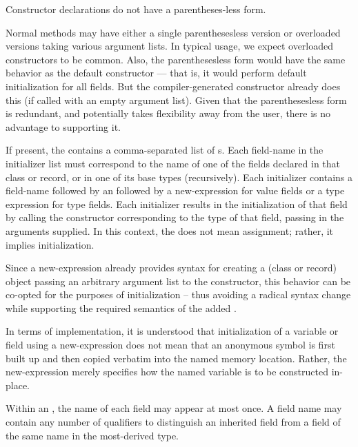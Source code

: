 Constructor declarations do not have a parentheses-less form.
\begin{rationale}
Normal methods may have either a single parenthesesless version or overloaded
versions taking various argument lists.  In typical usage, we expect overloaded
constructors to be common.  Also, the parenthesesless form would have the same
behavior as the default constructor --- that is, it would perform default
initialization for all fields.  But the compiler-generated constructor already
does this (if called with an empty argument list).  Given that the
parenthesesless form is redundant, and potentially takes flexibility away from
the user, there is no advantage to supporting it.
\end{rationale}

If present, the  contains a comma-separated list of
s.  Each field-name in the initializer list must correspond to the name
of one of the fields declared in that class or record, or in one of its base types
(recursively).  Each initializer contains a field-name followed by an
\chpl{=} followed by a new-expression for value fields or a type expression for type fields.
Each initializer results in the initialization of that field by
calling the constructor corresponding to the type of that field, passing in the arguments
supplied.  In this context, the \chpl{=} does not mean assignment; rather, it implies
initialization.

\begin{rationale}
Since a new-expression already provides syntax for creating a (class or record) object
passing an arbitrary argument list to the constructor, this behavior can be co-opted for
the purposes of initialization -- thus avoiding a radical syntax change while supporting
the required semantics of the added .  

In terms of implementation, it is understood that initialization of a variable or field
using a new-expression does not mean that an anonymous symbol is first built up and then
copied verbatim into the named memory location.  Rather, the new-expression merely
specifies how the named variable is to be constructed in-place.
\end{rationale}

Within an , the name of each field may appear at most
once.  A field name may contain any number of  qualifiers to distinguish an
inherited field from a field of the same name in the most-derived type.

